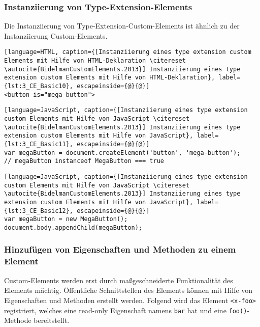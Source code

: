 \subsubsection{Instanziierung von Type-Extension-Elements}

Die Instanziierung von Type-Extension-Custom-Elements ist ähnlich zu der Instanziierung Custom-Elements.

\begin{enumerate}
\begin{lstlisting}[language=HTML, caption={[Instanziierung eines type extension custom Elements mit Hilfe von HTML-Deklaration \citereset \autocite{BidelmanCustomElements.2013}] Instanziierung eines type extension custom Elements mit Hilfe von HTML-Deklaration}, label={lst:3_CE_Basic10}, escapeinside={@}{@}]
<button is="mega-button">
\end{lstlisting}

\begin{lstlisting}[language=JavaScript, caption={[Instanziierung eines type extension custom Elements mit Hilfe von JavaScript \citereset \autocite{BidelmanCustomElements.2013}] Instanziierung eines type extension custom Elements mit Hilfe von JavaScript}, label={lst:3_CE_Basic11}, escapeinside={@}{@}]
var megaButton = document.createElement('button', 'mega-button');
// megaButton instanceof MegaButton === true
\end{lstlisting}

\begin{lstlisting}[language=JavaScript, caption={[Instanziierung eines type extension custom Elements mit Hilfe von JavaScript \citereset \autocite{BidelmanCustomElements.2013}] Instanziierung eines type extension custom Elements mit Hilfe von JavaScript}, label={lst:3_CE_Basic12}, escapeinside={@}{@}]
var megaButton = new MegaButton();
document.body.appendChild(megaButton);
\end{lstlisting}
\end{enumerate}

\subsubsection{Hinzufügen von Eigenschaften und Methoden zu einem Element}

Custom-Elements werden erst durch maßgeschneiderte Funktionalität des Elements mächtig. Öffentliche Schnittstellen des Elements können mit Hilfe von Eigenschaften und Methoden erstellt werden. Folgend wird das Element \lstinline|<x-foo>| registriert, welches eine read-only Eigenschaft namens \lstinline|bar| hat und eine \lstinline|foo()|-Methode bereitstellt.

